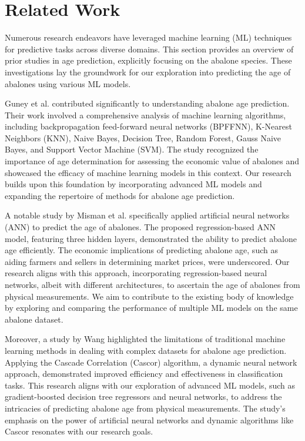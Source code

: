 \documentclass[12pt]{article}
\begin{document}
\section{Related Work}

Numerous research endeavors have leveraged machine learning (ML) techniques for predictive tasks across diverse domains. This section provides an overview of prior studies in age prediction, explicitly focusing on the abalone species. These investigations lay the groundwork for our exploration into predicting the age of abalones using various ML models.

Guney et al. \cite{djeddi_abalone_2022} contributed significantly to understanding abalone age prediction. Their work involved a comprehensive analysis of machine learning algorithms, including backpropagation feed-forward neural networks (BPFFNN), K-Nearest Neighbors (KNN), Naive Bayes, Decision Tree, Random Forest, Gauss Naive Bayes, and Support Vector Machine (SVM). The study recognized the importance of age determination for assessing the economic value of abalones and showcased the efficacy of machine learning models in this context. Our research builds upon this foundation by incorporating advanced ML models and expanding the repertoire of methods for abalone age prediction.

A notable study by Misman et al. \cite{misman_prediction_2019} specifically applied artificial neural networks (ANN) to predict the age of abalones. The proposed regression-based ANN model, featuring three hidden layers, demonstrated the ability to predict abalone age efficiently. The economic implications of predicting abalone age, such as aiding farmers and sellers in determining market prices, were underscored. Our research aligns with this approach, incorporating regression-based neural networks, albeit with different architectures, to ascertain the age of abalones from physical measurements. We aim to contribute to the existing body of knowledge by exploring and comparing the performance of multiple ML models on the same abalone dataset.

Moreover, a study by Wang \cite{wang_abalone_nodate} highlighted the limitations of traditional machine learning methods in dealing with complex datasets for abalone age prediction. Applying the Cascade Correlation (Cascor) algorithm, a dynamic neural network approach, demonstrated improved efficiency and effectiveness in classification tasks. This research aligns with our exploration of advanced ML models, such as gradient-boosted decision tree regressors and neural networks, to address the intricacies of predicting abalone age from physical measurements. The study's emphasis on the power of artificial neural networks and dynamic algorithms like Cascor resonates with our research goals.
\end{document}
